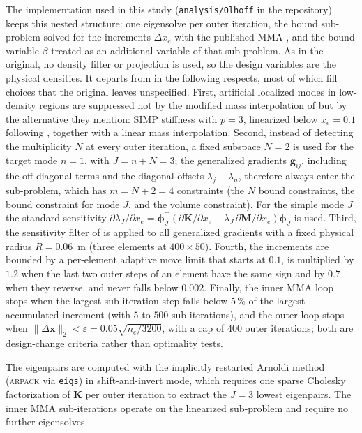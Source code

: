 \documentclass[pdflatex,lineno,sn-mathphys-ay]{sn-jnl}
\begin{document}
The implementation used in this study (\texttt{analysis/Olhoff} in the repository) keeps this nested structure: one eigensolve per outer iteration, the bound sub-problem solved for the increments $\Delta x_e$ with the published MMA \citep{Svanberg1987}, and the bound variable $\beta$ treated as an additional variable of that sub-problem. As in the original, no density filter or projection is used, so the design variables are the physical densities. It departs from \citet{Du2007} in the following respects, most of which fill choices that the original leaves unspecified.
First, artificial localized modes in low-density regions are suppressed not by the modified mass interpolation of \citet{Du2007} but by the alternative they mention: SIMP stiffness with $p = 3$, linearized below $x_e = 0.1$ following \citet{Pedersen2000}, together with a linear mass interpolation.
Second, instead of detecting the multiplicity $N$ at every outer iteration, a fixed subspace $N = 2$ is used for the target mode $n = 1$, with $J = n + N = 3$; the generalized gradients $\mathbf{g}_{ij}$, including the off-diagonal terms and the diagonal offsets $\lambda_j - \lambda_n$, therefore always enter the sub-problem, which has $m = N + 2 = 4$ constraints (the $N$ bound constraints, the bound constraint for mode $J$, and the volume constraint). For the simple mode $J$ the standard sensitivity $\partial\lambda_J/\partial x_e = \boldsymbol{\phi}_J^{\mathrm{T}}(\partial\mathbf{K}/\partial x_e - \lambda_J\,\partial\mathbf{M}/\partial x_e)\boldsymbol{\phi}_J$ is used.
Third, the sensitivity filter of \citet{Sigmund1997} is applied to all generalized gradients with a fixed physical radius $R = 0.06$~m (three elements at $400\times50$).
Fourth, the increments are bounded by a per-element adaptive move limit that starts at $0.1$, is multiplied by $1.2$ when the last two outer steps of an element have the same sign and by $0.7$ when they reverse, and never falls below $0.002$.
Finally, the inner MMA loop stops when the largest sub-iteration step falls below $5\,\%$ of the largest accumulated increment (with $5$ to $500$ sub-iterations), and the outer loop stops when $\lVert\Delta\mathbf{x}\rVert_2 < \varepsilon = 0.05\sqrt{n_e/3200}$, with a cap of $400$ outer iterations; both are design-change criteria rather than optimality tests.

The eigenpairs are computed with the implicitly restarted Arnoldi method (\textsc{arpack} via \texttt{eigs}) in shift-and-invert mode, which requires one sparse Cholesky factorization of $\mathbf{K}$ per outer iteration to extract the $J = 3$ lowest eigenpairs. The inner MMA sub-iterations operate on the linearized sub-problem and require no further eigensolves.
\end{document}
